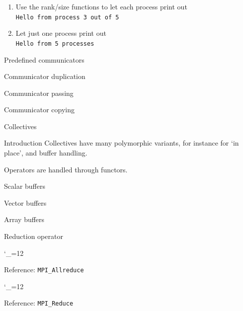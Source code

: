 \documentclass[10pt]{beamer}
\newcommand\referenceframe{\begingroup\catcode`\_=12 \referenceframett}
\gdef\referenceframett#1{
  \begin{numberedframe}{Reference: \texttt{MPI_#1}}
    \small
    
  \end{numberedframe}\endgroup}
\begin{document}

\begin{exerciseframe}[commrank]
  \begin{enumerate}
  \item Use the rank/size functions to let each process print out\\
    \lstinline[language=shell]{Hello from process 3 out of 5}
  \item Let just one process print out\\
    \lstinline[language=shell]{Hello from 5 processes}
  \end{enumerate}
\end{exerciseframe}

\begin{numberedframe}{Predefined communicators}
  
\end{numberedframe}
\begin{numberedframe}{Communicator duplication}
  
\end{numberedframe}
\begin{numberedframe}{Communicator passing}
  
\end{numberedframe}
\begin{numberedframe}{Communicator copying}
  
\end{numberedframe}

 {Collectives}

\begin{frame}{Introduction}
  Collectives have many polymorphic variants, for instance for `in place',
  and buffer handling.

  Operators are handled through functors.
\end{frame}
\begin{numberedframe}{Scalar buffers}
  
\end{numberedframe}
\begin{numberedframe}{Vector buffers}
  
\end{numberedframe}
\begin{numberedframe}{Array buffers}
  
\end{numberedframe}

\begin{numberedframe}{Reduction operator}
  
\end{numberedframe}
\referenceframe{Allreduce}
\referenceframe{Reduce}
\end{document}
